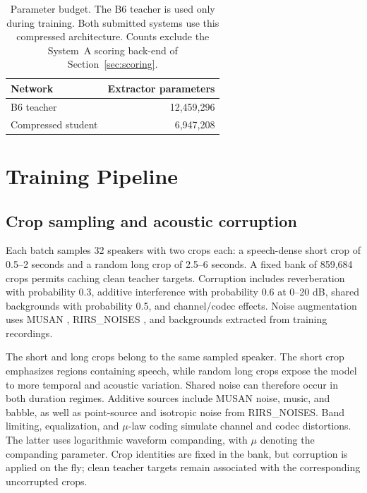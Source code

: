 \documentclass[11pt]{article}
\begin{document}
\begin{table}[t]
\centering
\begin{tabular}{lr}
\toprule
Network & Extractor parameters \\
\midrule
B6 teacher & 12,459,296 \\
Compressed student & 6,947,208 \\
\bottomrule
\end{tabular}
\caption{Parameter budget. The B6 teacher is used only during training. Both submitted systems use this compressed architecture. Counts exclude the System~A scoring back-end of Section~\ref{sec:scoring}.}
\label{tab:params}
\end{table}

\section{Training Pipeline}
\label{sec:training}
\subsection{Crop sampling and acoustic corruption}
Each batch samples 32 speakers with two crops each: a speech-dense short crop of 0.5--2 seconds and a random long crop of 2.5--6 seconds. A fixed bank of 859,684 crops permits caching clean teacher targets. Corruption includes reverberation with probability 0.3, additive interference with probability 0.6 at 0--20 dB, shared backgrounds with probability 0.5, and channel/codec effects. Noise augmentation uses MUSAN \citep{snyder2015musan}, RIRS\_NOISES \citep{ko2017augmentation}, and backgrounds extracted from training recordings.

The short and long crops belong to the same sampled speaker. The short crop emphasizes regions containing speech, while random long crops expose the model to more temporal and acoustic variation. Shared noise can therefore occur in both duration regimes. Additive sources include MUSAN noise, music, and babble, as well as point-source and isotropic noise from RIRS\_NOISES. Band limiting, equalization, and $\mu$-law coding simulate channel and codec distortions. The latter uses logarithmic waveform companding, with $\mu$ denoting the companding parameter. Crop identities are fixed in the bank, but corruption is applied on the fly; clean teacher targets remain associated with the corresponding uncorrupted crops.
\end{document}
